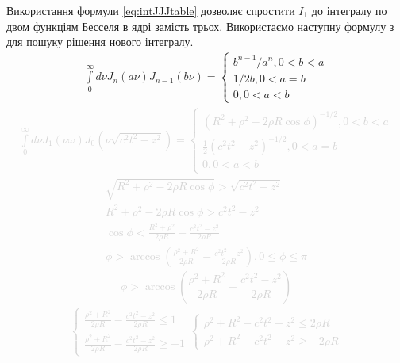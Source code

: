 Використання формули \eqref{eq:intJJJtable} дозволяє спростити $ I_1 $ до 
інтегралу по двом функціям Бесселя в ядрі замість трьох. Використаємо наступну 
формулу з \cite{imp:Golubovic2013} для пошуку рішення нового інтегралу. 
%
\begin{equation} \begin{aligned} \label{eq:intJJtable}
\int\limits_{0}^{\infty} d \nu
J_n \left( a \nu \right) J_{n-1} \left( b \nu \right) = \begin{cases} 
b^{n-1} / a^n , 0 < b < a \\
1 / 2 b , 0 < a = b \\
0 , 0 < a < b
\end{cases} 
\end{aligned} \end{equation}
%
\textcolor{lightgray}{ \begin{equation*} \begin{aligned}
\int\limits_{0}^{\infty} d \nu J_1 \left( \nu \omega \right) 
J_0 \left( \nu \sqrt{c^2 t^2 - z^2} \right) = \begin{cases}
\left( R^2 + \rho^2 - 2 \rho R \cos \phi \right)^{-1/2}, 0 < b < a \\
\frac{1}{2} \left( c^2 t^2 - z^2 \right)^{-1/2}, 0 < a = b \\
0 , 0 < a < b
\end{cases} 
\end{aligned} \end{equation*} }
%
\textcolor{lightgray}{ \begin{equation*} \begin{aligned}
\sqrt{R^2 + \rho^2 - 2 \rho R \cos \phi} > \sqrt{c^2 t^2 - z^2} \\
R^2 + \rho^2 - 2 \rho R \cos \phi > c^2 t^2 - z^2 \\
\cos \phi < \frac{R^2 + \rho^2}{2 \rho R} - \frac{c^2 t^2 - z^2}{2 \rho R} \\
\phi > \arccos \left( \frac{\rho^2 + R^2}{2 \rho R} - 
\frac{c^2 t^2 - z^2}{2 \rho R} \right), 0 \leq \phi \leq \pi
\end{aligned} \end{equation*} }
%
\textcolor{lightgray}{ \begin{equation*}
\phi > \arccos \left( \frac{\rho^2 + R^2}{2 \rho R} - 
\frac{c^2 t^2 - z^2}{2 \rho R} \right)
\end{equation*} }
%
\textcolor{lightgray}{ \begin{equation*} \begin{aligned}
\begin{cases}
\frac{\rho^2 + R^2}{2 \rho R} - \frac{c^2 t^2 - z^2}{2 \rho R} \leq 1 \\
\frac{\rho^2 + R^2}{2 \rho R} - \frac{c^2 t^2 - z^2}{2 \rho R} \geq - 1
\end{cases}
\begin{cases}
\rho^2 + R^2 - c^2 t^2 + z^2 \leq 2 \rho R \\
\rho^2 + R^2 - c^2 t^2 + z^2 \geq - 2 \rho R
\end{cases}
\end{aligned} \end{equation*} }
